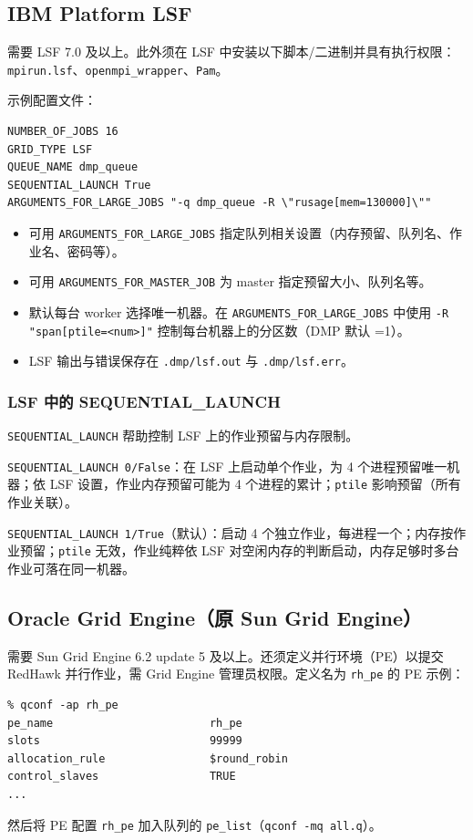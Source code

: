 \subsection{IBM Platform LSF}
需要 LSF 7.0 及以上。此外须在 LSF 中安装以下脚本/二进制并具有执行权限：\texttt{mpirun.lsf}、\texttt{openmpi\_wrapper}、\texttt{Pam}。

示例配置文件：
\begin{lstlisting}
NUMBER_OF_JOBS 16
GRID_TYPE LSF
QUEUE_NAME dmp_queue
SEQUENTIAL_LAUNCH True
ARGUMENTS_FOR_LARGE_JOBS "-q dmp_queue -R \"rusage[mem=130000]\""
\end{lstlisting}

\begin{itemize}
  \item 可用 \texttt{ARGUMENTS\_FOR\_LARGE\_JOBS} 指定队列相关设置（内存预留、队列名、作业名、密码等）。
  \item 可用 \texttt{ARGUMENTS\_FOR\_MASTER\_JOB} 为 master 指定预留大小、队列名等。
  \item 默认每台 worker 选择唯一机器。在 \texttt{ARGUMENTS\_FOR\_LARGE\_JOBS} 中使用 \texttt{-R "span[ptile=<num>]"} 控制每台机器上的分区数（DMP 默认 =1）。
  \item LSF 输出与错误保存在 \texttt{.dmp/lsf.out} 与 \texttt{.dmp/lsf.err}。
\end{itemize}

\subsubsection{LSF 中的 SEQUENTIAL\_LAUNCH}
\texttt{SEQUENTIAL\_LAUNCH} 帮助控制 LSF 上的作业预留与内存限制。

\texttt{SEQUENTIAL\_LAUNCH 0/False}：在 LSF 上启动单个作业，为 4 个进程预留唯一机器；依 LSF 设置，作业内存预留可能为 4 个进程的累计；\texttt{ptile} 影响预留（所有作业关联）。

\texttt{SEQUENTIAL\_LAUNCH 1/True}（默认）：启动 4 个独立作业，每进程一个；内存按作业预留；\texttt{ptile} 无效，作业纯粹依 LSF 对空闲内存的判断启动，内存足够时多台作业可落在同一机器。

\subsection{Oracle Grid Engine（原 Sun Grid Engine）}
需要 Sun Grid Engine 6.2 update 5 及以上。还须定义并行环境（PE）以提交 RedHawk 并行作业，需 Grid Engine 管理员权限。定义名为 \texttt{rh\_pe} 的 PE 示例：
\begin{lstlisting}
% qconf -ap rh_pe
pe_name                        rh_pe
slots                          99999
allocation_rule                $round_robin
control_slaves                 TRUE
...
\end{lstlisting}
然后将 PE 配置 \texttt{rh\_pe} 加入队列的 \texttt{pe\_list}（\texttt{qconf -mq all.q}）。

